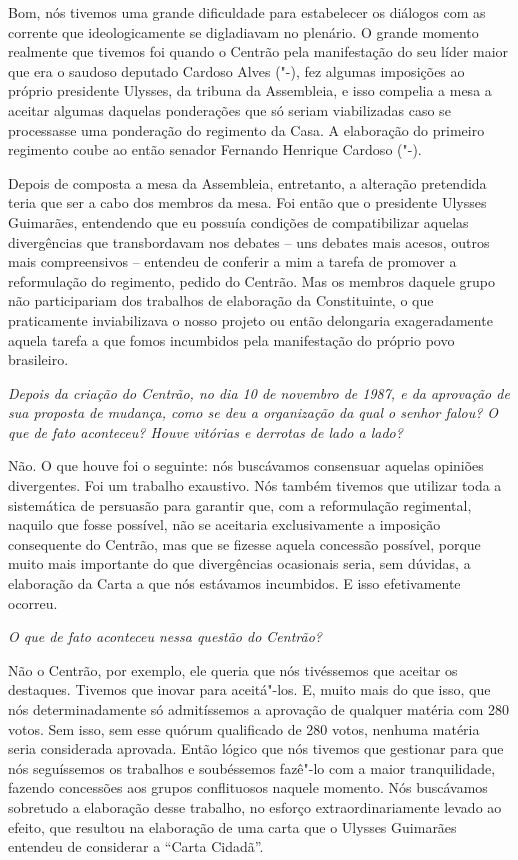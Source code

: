 Bom, nós tivemos uma grande dificuldade para
estabelecer os diálogos com as corrente que ideologicamente se
digladiavam no plenário. O grande momento realmente que tivemos foi
quando o Centrão pela manifestação do seu líder maior que era o saudoso
deputado Cardoso Alves ("-), fez algumas imposições ao próprio
presidente Ulysses, da tribuna da Assembleia, e isso compelia a mesa a
aceitar algumas daquelas ponderações que só seriam viabilizadas caso se
processasse uma ponderação do regimento da Casa. A elaboração do
primeiro regimento coube ao então senador Fernando Henrique Cardoso
("-).

Depois de composta a mesa da Assembleia, entretanto, a alteração
pretendida teria que ser a cabo dos membros da mesa. Foi então que o
presidente Ulysses Guimarães, entendendo que eu possuía condições de
compatibilizar aquelas divergências que transbordavam nos debates -- uns
debates mais acesos, outros mais compreensivos -- entendeu de conferir a
mim a tarefa de promover a reformulação do regimento, pedido do Centrão.
Mas os membros daquele grupo não participariam dos trabalhos de
elaboração da Constituinte, o que praticamente inviabilizava o nosso
projeto ou então delongaria exageradamente aquela tarefa a que fomos
incumbidos pela manifestação do próprio povo brasileiro.

\medskip

\emph{Depois da criação do Centrão, no dia 10 de novembro de 1987, e
da aprovação de sua proposta de mudança, como se deu a organização da
qual o senhor falou? O que de fato aconteceu? Houve vitórias e derrotas
de lado a lado?}

Não. O que houve foi o seguinte: nós buscávamos
consensuar aquelas opiniões divergentes. Foi um trabalho exaustivo. Nós
também tivemos que utilizar toda a sistemática de persuasão para
garantir que, com a reformulação regimental, naquilo que fosse possível,
não se aceitaria exclusivamente a imposição consequente do Centrão, mas
que se fizesse aquela concessão possível, porque muito mais importante
do que divergências ocasionais seria, sem dúvidas, a elaboração da Carta
a que nós estávamos incumbidos. E isso efetivamente ocorreu.

\medskip

\emph{O que de fato aconteceu nessa questão do Centrão?}

Não o Centrão, por exemplo, ele queria que nós
tivéssemos que aceitar os destaques. Tivemos que inovar para aceitá"-los.
E, muito mais do que isso, que nós determinadamente só admitíssemos a
aprovação de qualquer matéria com 280 votos. Sem isso, sem esse quórum
qualificado de 280 votos, nenhuma matéria seria considerada aprovada.
Então lógico que nós tivemos que gestionar para que nós seguíssemos os
trabalhos e soubéssemos fazê"-lo com a maior tranquilidade, fazendo
concessões aos grupos conflituosos naquele momento. Nós buscávamos
sobretudo a elaboração desse trabalho, no esforço extraordinariamente
levado ao efeito, que resultou na elaboração de uma carta que o Ulysses
Guimarães entendeu de considerar a ``Carta Cidadã''.

